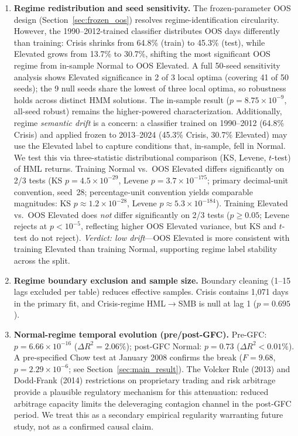 \documentclass[sigconf,anonymous]{acmart}
\begin{document}
\begin{enumerate}
    \item \textbf{Regime redistribution and seed sensitivity.}
    The frozen-parameter OOS design (Section~\ref{sec:frozen_oos}) resolves
    regime-identification circularity. However, the 1990--2012-trained classifier
    distributes OOS days differently than training: Crisis shrinks from 64.8\%
    (train) to 45.3\% (test), while Elevated grows from 13.7\% to 30.7\%,
    shifting the most significant OOS regime from in-sample Normal to OOS Elevated.
    A full 50-seed sensitivity analysis shows Elevated significance in 2 of 3 local
    optima (covering 41 of 50 seeds); the 9 null seeds share the lowest of three
    local optima, so robustness holds across distinct HMM solutions. The in-sample result ($p =
    8.75 \times 10^{-9}$, all-seed robust) remains the higher-powered characterization.
    Additionally, regime \emph{semantic drift} is a concern: a classifier trained on
    1990--2012 (64.8\% Crisis) and applied frozen to 2013--2024 (45.3\% Crisis,
    30.7\% Elevated) may use the Elevated label to capture conditions that, in-sample,
    fell in Normal. We test this via three-statistic distributional comparison
    (KS, Levene, $t$-test) of HML returns.
    Training Normal vs.\ OOS Elevated differs significantly on 2/3 tests
    (KS $p = 4.5\times10^{-29}$, Levene $p = 3.7\times10^{-175}$;
    primary decimal-unit convention, seed~28; percentage-unit convention yields
    comparable magnitudes: KS $p \approx 1.2\times10^{-28}$,
    Levene $p \approx 5.3\times10^{-184}$).
    Training Elevated vs.\ OOS Elevated does \emph{not} differ significantly
    on 2/3 tests ($p \geq 0.05$; Levene rejects at $p < 10^{-5}$,
    reflecting higher OOS Elevated variance, but KS and $t$-test do not reject).
    \emph{Verdict: low drift}---OOS Elevated is more consistent with training
    Elevated than training Normal, supporting regime label stability across the split.

    \item \textbf{Regime boundary exclusion and sample size.} Boundary cleaning
    (1--15 lags excluded per table) reduces effective samples. Crisis contains
    1,071 days in the primary fit, and Crisis-regime HML$\to$SMB is null at
    lag 1 ($p = 0.695$).

    \item \textbf{Normal-regime temporal evolution (pre/post-GFC).}
    Pre-GFC: $p = 6.66\times10^{-16}$ ($\Delta R^2 = 2.06\%$); post-GFC Normal:
    $p = 0.73$ ($\Delta R^2 < 0.01\%$). A pre-specified Chow test at January 2008
    confirms the break ($F = 9.68$, $p = 2.29\times10^{-6}$; see Section~\ref{sec:main_result}).
    The Volcker Rule (2013) and Dodd-Frank (2014) restrictions on proprietary trading
    and risk arbitrage provide a plausible regulatory mechanism for this attenuation:
    reduced arbitrage capacity limits the deleveraging contagion channel in the post-GFC
    period. We treat this as a secondary empirical regularity warranting future study,
    not as a confirmed causal claim.


\end{enumerate}
\end{document}
